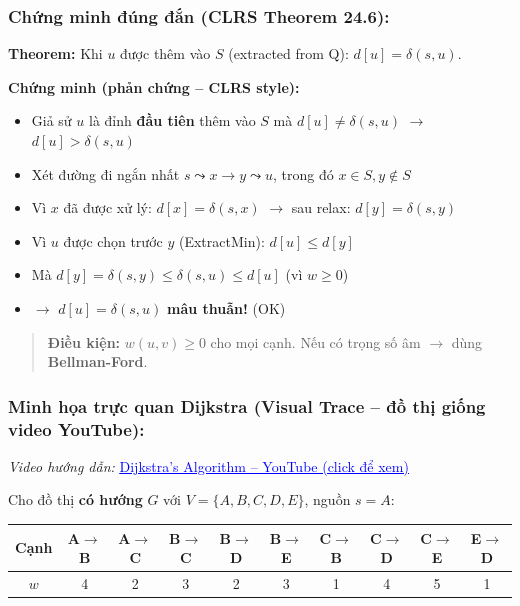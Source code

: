 \documentclass[10pt]{article}
\providecommand{\tightlist}{\setlength{\itemsep}{0pt}\setlength{\parskip}{0pt}}
\begin{document}
\subsubsection{Chứng minh đúng đắn (CLRS Theorem
24.6):}\label{chux1ee9ng-minh-ux111uxfang-ux111ux1eafn-clrs-theorem-24.6}

\textbf{Theorem:} Khi \(u\) được thêm vào \(S\) (extracted from Q):
\(d[u] = \delta(s,u)\).

\textbf{Chứng minh (phản chứng -- CLRS style):}

\begin{itemize}
\tightlist
\item
  Giả sử \(u\) là đỉnh \textbf{đầu tiên} thêm vào \(S\) mà
  \(d[u] \neq \delta(s,u)\) \(\to\) \(d[u] > \delta(s,u)\)
\item
  Xét đường đi ngắn nhất \(s \leadsto x \to y \leadsto u\), trong đó
  \(x \in S, y \notin S\)
\item
  Vì \(x\) đã được xử lý: \(d[x] = \delta(s,x)\) \(\to\) sau relax:
  \(d[y] = \delta(s,y)\)
\item
  Vì \(u\) được chọn trước \(y\) (ExtractMin): \(d[u] \leq d[y]\)
\item
  Mà \(d[y] = \delta(s,y) \leq \delta(s,u) \leq d[u]\) (vì \(w \geq 0\))
\item
  \(\to\) \(d[u] = \delta(s,u)\) \textbf{mâu thuẫn!} (OK)
\end{itemize}

\begin{quote}
\textbf{Điều kiện:} \(w(u,v) \geq 0\) cho mọi cạnh. Nếu có trọng số âm
\(\to\) dùng \textbf{Bellman-Ford}.
\end{quote}

\subsubsection{Minh họa trực quan Dijkstra (Visual Trace -- đồ thị giống video YouTube):}

\begin{center}
\textit{Video hướng dẫn:} \href{https://www.youtube.com/watch?v=_lHSawdgXpI}{\textcolor{blue}{\underline{Dijkstra's Algorithm -- YouTube (click để xem)}}}
\end{center}

Cho đồ thị \textbf{có hướng} $G$ với $V = \{A, B, C, D, E\}$, nguồn $s = A$:

\begin{center}
\begin{tabular}{|c|c|c|c|c|c|c|c|c|c|}
\hline
Cạnh & A$\to$B & A$\to$C & B$\to$C & B$\to$D & B$\to$E & C$\to$B & C$\to$D & C$\to$E & E$\to$D \\
\hline
$w$ & 4 & 2 & 3 & 2 & 3 & 1 & 4 & 5 & 1 \\
\hline
\end{tabular}
\label{tab:dijkstra-edges}
\end{center}
\end{document}

